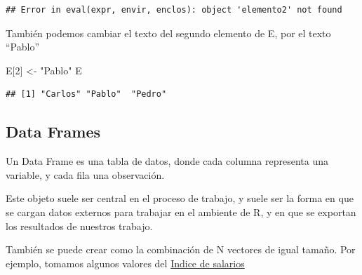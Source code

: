 \documentclass[]{book}
\newenvironment{Shaded}{\begin{snugshade}}{\end{snugshade}}
\newcommand{\DecValTok}[1]{\textcolor[rgb]{0.00,0.00,0.81}{#1}}
\newcommand{\NormalTok}[1]{#1}
\newcommand{\StringTok}[1]{\textcolor[rgb]{0.31,0.60,0.02}{#1}}
\begin{document}
\begin{verbatim}
## Error in eval(expr, envir, enclos): object 'elemento2' not found
\end{verbatim}

También podemos cambiar el texto del segundo elemento de E, por el texto ``Pablo''

\begin{Shaded}
\begin{Highlighting}[]
\NormalTok{E[}\DecValTok{2}\NormalTok{] <-}\StringTok{ "Pablo"}
\NormalTok{E}
\end{Highlighting}
\end{Shaded}

\begin{verbatim}
## [1] "Carlos" "Pablo"  "Pedro"
\end{verbatim}

\hypertarget{data-frames}{%
\subsection{Data Frames}\label{data-frames}}

Un Data Frame es una tabla de datos, donde cada columna representa una variable, y cada fila una observación.

Este objeto suele ser central en el proceso de trabajo, y suele ser la forma en que se cargan datos externos para trabajar en el ambiente de R, y en que se exportan los resultados de nuestros trabajo.

También se puede crear como la combinación de N vectores de igual tamaño. Por ejemplo, tomamos algunos valores del \href{http://www.indec.gob.ar/bajarCuadroEstadistico.asp?idc=4020B33440609462654542BD0BC320F1523DA0DC52C396201DB4DD5861FFEDC9AD1436681AC84179}{Indice de salarios}
\end{document}
